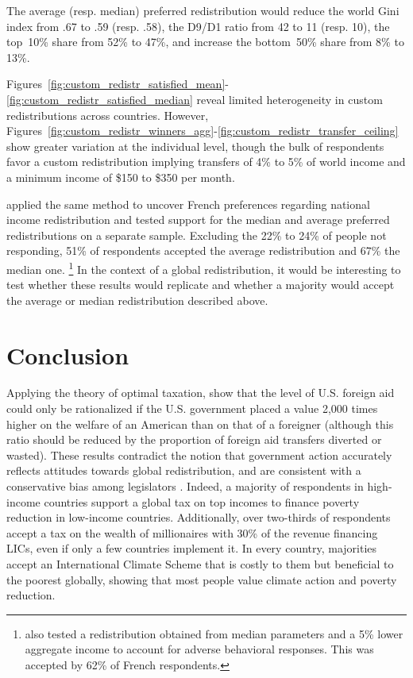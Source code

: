 \documentclass[12pt,english]{article}
\begin{document}
The average (resp. median) preferred redistribution would reduce the world Gini index from .67 to .59 (resp. .58), the D9/D1 ratio from 42 to 11 (resp. 10), the top~10\% share from 52\% to 47\%, and increase the bottom~50\% share from 8\% to 13\%.

Figures~\ref{fig:custom_redistr_satisfied_mean}-\ref{fig:custom_redistr_satisfied_median} reveal limited heterogeneity in custom redistributions across countries. However, Figures~\ref{fig:custom_redistr_winners_agg}-\ref{fig:custom_redistr_transfer_ceiling} show greater variation at the individual level, though the bulk of respondents favor a custom redistribution implying transfers of 4\% to 5\% of world income and a minimum income of \$150 to \$350 per month. 

\cite{fabre_french_2022} applied the same method to uncover French preferences regarding national income redistribution and tested support for the median and average %
preferred redistributions on a separate sample. Excluding the 22\% to 24\% of people not responding, 51\% of respondents accepted the average redistribution and 67\% the median one.%
\footnote{\cite{fabre_french_2022} also tested a redistribution obtained from median parameters and a 5\% lower aggregate income to account for adverse behavioral responses. This was accepted by 62\% of French respondents.} 
In the context of a global redistribution, it would be interesting to test whether these results would replicate and whether a majority would accept the average or median redistribution described above. 

\section{Conclusion} %

Applying the theory of optimal taxation, \cite{kopczuk_limitations_2005} show that the level of U.S. foreign aid could only be rationalized if the U.S. government placed a value 2,000 times higher on the welfare of an American than on that of a foreigner (although this ratio should be reduced by the proportion of foreign aid transfers diverted or wasted). 
These results contradict the notion that government action accurately reflects attitudes towards global redistribution, and are consistent with a conservative bias among legislators \citep{gilens_testing_2014,broockman_bias_2018,pilet_politicians_2024}. 
Indeed, a majority of respondents in high-income countries support a global tax on top incomes to finance poverty reduction in low-income countries. Additionally, over two-thirds of respondents accept a tax on the wealth of millionaires with 30\% of the revenue financing LICs, even if only a few countries implement it. In every country, majorities accept an International Climate Scheme that is costly to them but beneficial to the poorest globally, showing that most people value climate action and poverty reduction. 
\end{document}
